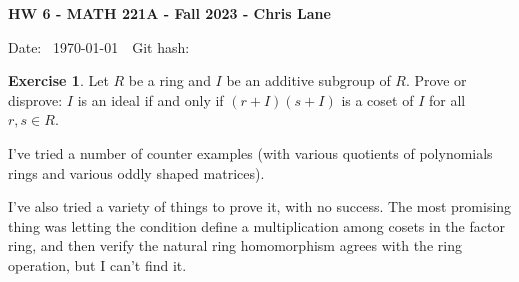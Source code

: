 \documentclass[11pt,oneside]{article}
\numberwithin{equation}{section}
\theoremstyle{definition}
\newtheorem{exercise}{Exercise}
\begin{document}
\textbf{HW 6 - MATH 221A - Fall 2023 - Chris Lane}

Date: \hhmmsstime{} \ \today \ \ Git hash: 


\begin{exercise}
  Let $R$ be a ring and $I$ be an additive subgroup of $R$.  Prove or
  disprove: $I$ is an ideal if and only if $(r+I)(s+I)$ is a coset of
  $I$ for all $r, s \in R$.
\end{exercise}
\begin{solution}
  I've tried a number of counter examples (with various quotients of
  polynomials rings and various oddly shaped matrices).  

  I've also tried a variety of things to prove it, with no
  success. The most promising thing was letting the condition define a
  multiplication among cosets in the factor ring, and then verify the
  natural ring homomorphism agrees with the ring operation, but I
  can't find it.
  
\end{solution}
\end{document}
